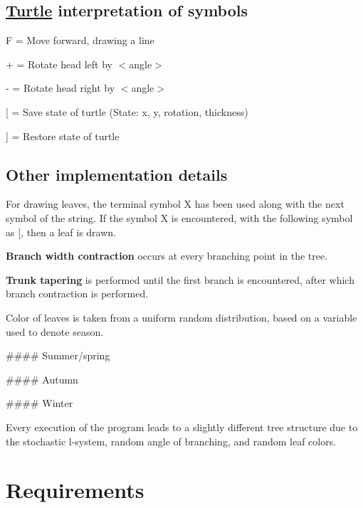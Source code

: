 \subsection*{\hyperlink{classTurtle}{Turtle} interpretation of symbols}


\begin{DoxyEnumerate}
\item {\ttfamily F} = Move forward, drawing a line
\item {\ttfamily +} = Rotate head left by $<$angle$>$
\item {\ttfamily -\/} = Rotate head right by $<$angle$>$
\item {\ttfamily \mbox{[}} = Save state of turtle (State\+: x, y, rotation, thickness)
\item {\ttfamily \mbox{]}} = Restore state of turtle
\end{DoxyEnumerate}

\subsection*{Other implementation details}

For drawing leaves, the terminal symbol {\ttfamily X} has been used along with the next symbol of the string. If the symbol {\ttfamily X} is encountered, with the following symbol as {\ttfamily \mbox{[}}, then a leaf is drawn.

{\bfseries Branch width contraction} occurs at every branching point in the tree.

{\bfseries Trunk tapering} is performed until the first branch is encountered, after which branch contraction is performed.

Color of leaves is taken from a uniform random distribution, based on a variable used to denote season.


\begin{DoxyItemize}
\item \#\#\#\# Summer/spring 
\item \#\#\#\# Autumn 
\item \#\#\#\# Winter 
\end{DoxyItemize}

Every execution of the program leads to a slightly different tree structure due to the stochastic l-\/system, random angle of branching, and random leaf colors.

\section*{Requirements}


